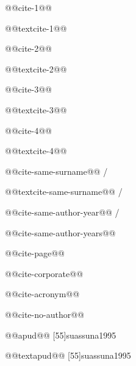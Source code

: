 \documentclass{article}
\begin{document}
@@cite-1@@ \cite{authier1982}\par
@@textcite-1@@ \textcite{authier1982}\par
@@cite-2@@ \cite{clarac1985}\par
@@textcite-2@@ \textcite{clarac1985}\par
@@cite-3@@ \cite{three2017}\par
@@textcite-3@@ \textcite{three2017}\par
@@cite-4@@ \cite{four2019}\par
@@textcite-4@@ \textcite{four2019}\par
@@cite-same-surname@@ \cite{barbosaC1958} / \cite{barbosaO1958}\par
@@textcite-same-surname@@ \textcite{barbosaC1958} / \textcite{barbosaO1958}\par
@@cite-same-author-year@@ \textcite{reeside1927a} / \cite{reeside1927b}\par
@@cite-same-author-years@@ \cites{dreyfuss1989}{dreyfuss1991}{dreyfuss1995}\par
@@cite-page@@ \cite[293]{derrida1967}\par
@@cite-corporate@@ \cite{brasil1995}\par
@@cite-acronym@@ \cite{ibge2011}\par
@@cite-no-author@@ \cite{ingles2012}\par
@@apud@@ [55]{suassuna1995}\par
@@textapud@@ [55]{suassuna1995}\par
\end{document}
